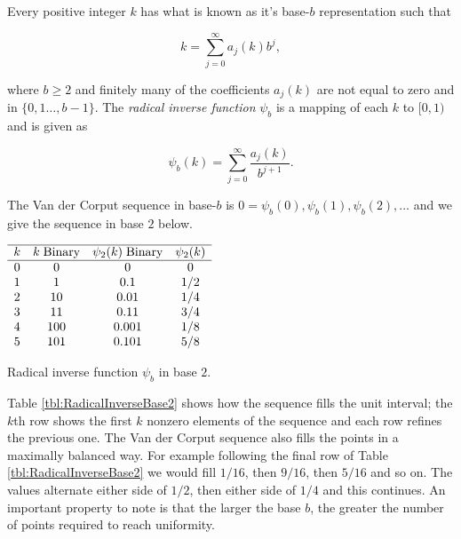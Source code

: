 Every positive integer $k$ has what is known as it's base-$b$ representation such that

\begin{equation} \label{eqn:BaseBKRepresentation}
    k = \sum_{j=0}^{\infty}{a_j(k)b^j},
\end{equation}

where $b \ge 2$ and finitely many of the coefficients $a_j(k)$ are not equal to zero and in $\{0,1\dots,b-1\}$. The \textit{radical inverse function} $\psi_b$ is a mapping of each $k$ to $[0,1)$ and is given as

\begin{equation} \label{eqn:RadicalInverseFunction}
    \psi_b(k) = \sum_{j=0}^{\infty}{\frac{a_j(k)}{b^{j+1}}}.
\end{equation}

The Van der Corput sequence in base-$b$ is $0 = \psi_b(0), \psi_b(1), \psi_b(2),\dots$ and we give the sequence in base $2$ below.

\begin{table}[!h]
\centering
$\begin{array}{ c c c c } 
 \hline
 k & k\;\text{Binary} & \psi_2(k)\;\text{Binary} & \psi_2(k) \\
 \hline
 0 & 0   & 0     & 0 \\
 1 & 1   & 0.1   & 1/2 \\
 2 & 10  & 0.01  & 1/4 \\
 3 & 11  & 0.11  & 3/4 \\
 4 & 100 & 0.001 & 1/8 \\
 5 & 101 & 0.101 & 5/8 \\
\end{array}$
\caption{Radical inverse function $\psi_b$ in base $2$.}
\label{tbl:RadicalInverseBase2}
\end{table}

Table \ref{tbl:RadicalInverseBase2} shows how the sequence fills the unit interval; the $k$th row shows the first $k$ nonzero elements of the sequence and each row refines the previous one. The Van der Corput sequence also fills the points in a maximally balanced way. For example following the final row of Table \ref{tbl:RadicalInverseBase2} we would fill $1/16$, then $9/16$, then $5/16$ and so on. The values alternate either side of $1/2$, then either side of $1/4$ and this continues. An important property to note is that the larger the base $b$, the greater the number of points required to reach uniformity.

